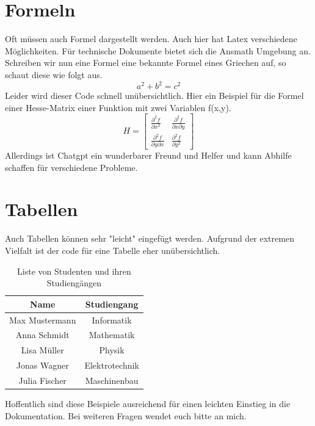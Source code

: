 \documentclass[a4paper,12pt,numbers=noenddot]{scrreprt} %
\begin{document}
\section{Formeln}
Oft müssen auch Formel dargestellt werden. Auch hier hat Latex verschiedene Möglichkeiten. Für technische Dokumente bietet sich die Ansmath Umgebung an. Schreiben wir nun eine Formel eine bekannte Formel eines Griechen auf, so schaut diese wie folgt aus.
\begin{equation}
    a^2 + b^2 = c^2
\end{equation}
Leider wird dieser Code schnell unübersichtlich. Hier ein Beispiel für die Formel einer Hesse-Matrix einer Funktion mit zwei Variablen f(x,y).
\begin{equation}
    H =\begin{bmatrix}\frac{\partial^2 f}{\partial x^2} & \frac{\partial^2 f}{\partial x \partial y} \\\frac{\partial^2 f}{\partial y \partial x} & \frac{\partial^2 f}{\partial y^2}
    \end{bmatrix}
\end{equation}
Allerdings ist Chatgpt ein wunderbarer Freund und Helfer und kann Abhilfe schaffen für verschiedene Probleme. \cite{böswirth2012technische}

\section{Tabellen}
Auch Tabellen können sehr "leicht" eingefügt werden. Aufgrund der extremen Vielfalt ist der code für eine Tabelle eher unübersichtlich.

\begin{table}[H]
    \centering %
    \begin{tabular}{|c|c|} %
        \hline %
        \textbf{Name} & \textbf{Studiengang} \\
        \hline
        Max Mustermann & Informatik \\ %
        Anna Schmidt & Mathematik \\
        Lisa Müller & Physik \\
        Jonas Wagner & Elektrotechnik \\
        Julia Fischer & Maschinenbau \\
        \hline
    \end{tabular}
    \caption{Liste von Studenten und ihren Studiengängen}
    \label{tab:studenten_studiengaenge}
\end{table}
Hoffentlich sind diese Beispiele ausreichend für einen leichten Einstieg in die Dokumentation. Bei weiteren Fragen wendet euch bitte an mich. 
\end{document}
